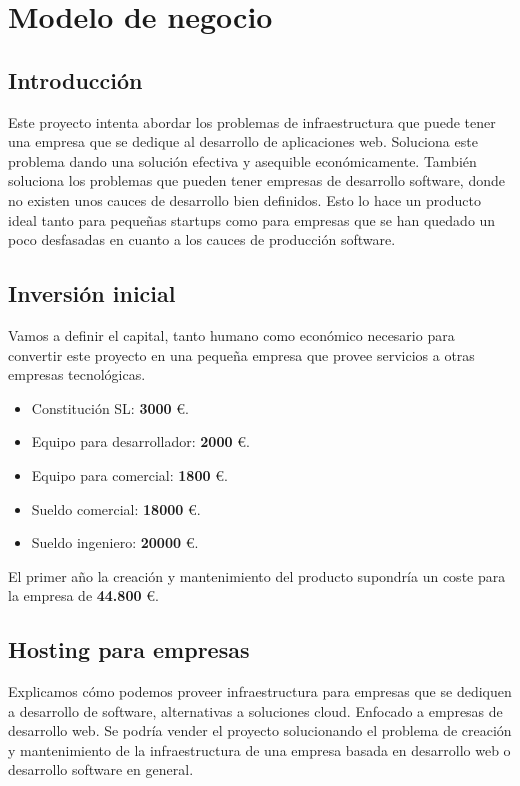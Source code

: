 \chapter {Modelo de negocio}

\section{Introducción}
	\begin{text}
		Este proyecto intenta abordar los problemas de infraestructura que puede tener una empresa que se dedique al desarrollo de aplicaciones web. Soluciona este problema dando una solución efectiva y asequible económicamente. También soluciona los problemas que pueden tener empresas de desarrollo software, donde no existen unos cauces de desarrollo bien definidos. Esto lo hace un producto ideal tanto para pequeñas startups como para empresas que se han quedado un poco desfasadas en cuanto a los cauces de producción software.
	\end{text}

\section{Inversión inicial}
	\begin{text}
		Vamos a definir el capital, tanto humano como económico necesario para convertir este proyecto en una pequeña empresa que provee servicios a otras empresas tecnológicas.
		
		\begin{itemize}
			\item Constitución SL: \textbf{3000} \euro.
			\item Equipo para desarrollador: \textbf{2000} \euro.
			\item Equipo para comercial: \textbf{1800} \euro.
			\item Sueldo comercial: \textbf{18000} \euro.
			\item Sueldo ingeniero: \textbf{20000} \euro.
		\end{itemize}
	
		El primer año la creación y mantenimiento del producto supondría un coste para la empresa de \textbf{44.800} \euro.
	\end{text}

\section{Hosting para empresas}
	\begin{text}
		Explicamos cómo podemos proveer infraestructura para empresas que se dediquen a desarrollo de software, alternativas a soluciones cloud.
		Enfocado a empresas de desarrollo web. Se podría vender el proyecto solucionando el problema de creación y mantenimiento de la infraestructura de una empresa basada en desarrollo web o desarrollo software en general.
	\end{text}

